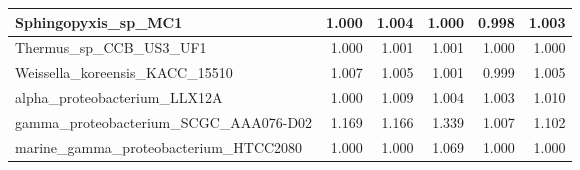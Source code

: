\documentclass[12pt,a4paper]{article}
\begin{document}
\begin{table}[ht]
\begin{center}
\begin{tabular}{|l*{5}{|r}|}
Sphingopyxis\_sp\_MC1 & 1.000 & 1.004 & 1.000 & 0.998 & 1.003 \\ \hline
Thermus\_sp\_CCB\_US3\_UF1 & 1.000 & 1.001 & 1.001 & 1.000 & 1.000 \\ \hline
Weissella\_koreensis\_KACC\_15510 & 1.007 & 1.005 & 1.001 & 0.999 & 1.005 \\ \hline
alpha\_proteobacterium\_LLX12A & 1.000 & 1.009 & 1.004 & 1.003 & 1.010 \\ \hline
gamma\_proteobacterium\_SCGC\_AAA076-D02 & 1.169 & 1.166 & 1.339 & 1.007 & 1.102 \\ \hline
marine\_gamma\_proteobacterium\_HTCC2080 & 1.000 & 1.000 & 1.069 & 1.000 & 1.000 \\ \hline
\end{tabular}
\end{center}
\end{table}
\end{document}
